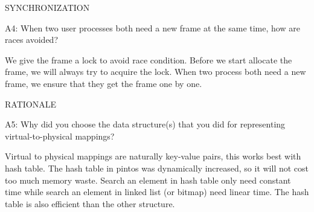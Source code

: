 \begin{aspect}{SYNCHRONIZATION}
  \begin{qc}
    A4: When two user processes both need a new frame at the same time,
    how are races avoided?
  \end{qc}
  We give the frame a lock to avoid race condition. Before we start allocate the frame, we will always try to acquire the lock. When two process both need a new frame, we ensure that they get the frame one by one.
\end{aspect}

\begin{aspect}{RATIONALE}
  \begin{qc}
    A5: Why did you choose the data structure(s) that you did
    for representing virtual-to-physical mappings?
  \end{qc}
  Virtual to physical mappings are naturally key-value pairs, this works best with hash table. The hash table in pintos was dynamically increased, so it will not cost too much memory waste. Search an element in hash table only need constant time while search an element in linked list (or bitmap) need linear time. The hash table is also efficient than the other structure.
\end{aspect}
